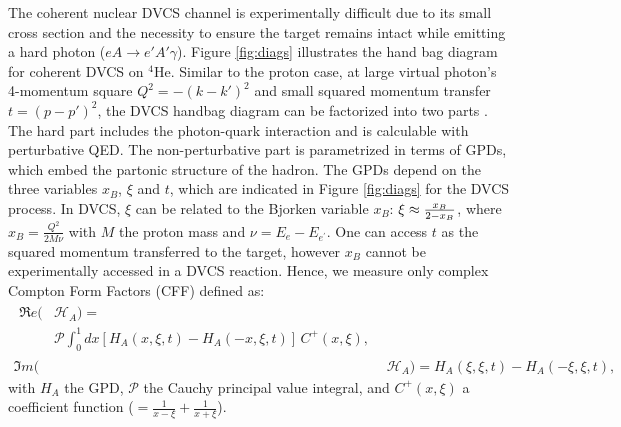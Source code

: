 \documentclass[preprint,nofootinbib,showpacs,prl,superscriptaddress,secnumarabic,amssymb,nobibnotes,aps,floatfix]{revtex4}
\begin{document}
The coherent nuclear DVCS channel is experimentally difficult due to  
its small cross section and the necessity to ensure the target remains 
intact while emitting a hard photon ($eA \rightarrow e' A' \gamma$). Figure 
\ref{fig:diags} illustrates the hand bag diagram for coherent DVCS on 
$^4$He. Similar to the proton case, at large virtual photon's 4-momentum square 
$Q^2=-(k-k')^{2}$ and small squared momentum transfer $t=(p-p')^{2}$,
the DVCS handbag diagram can be factorized into two parts 
\cite{Freund_Collins,Ji_Osborne}. The hard part includes the photon-quark 
interaction and is calculable with perturbative QED.  The non-perturbative 
part is parametrized in terms of GPDs, which embed the partonic structure of 
the hadron. The GPDs depend on the three variables $x_B$, $\xi$ and $t$, which are 
indicated in Figure \ref{fig:diags} for the DVCS process. In DVCS, $\xi$ can 
be related to the Bjorken variable $x_{B}$: $\xi\approx {{x_B}\over{2-x_B}}$, 
where $x_B=\frac{Q^2}{2M\nu}$ with $M$ the proton mass and 
$\nu=E_e-E_{e^\prime}$. One can access $t$ as the squared momentum 
transferred to the target, however $x_B$ cannot be experimentally 
accessed in a DVCS reaction. Hence, we measure only complex Compton Form 
Factors (CFF) \cite{Guidal:2013rya} defined as:
\begin{align}
\begin{split}
\Re e(&\mathcal{H}_{A}) = \\
    &\mathcal{P} 
\int_{0}^{1}dx[H_A(x,\xi,t)-H_A(-x,\xi,t)] \, C^{+}(x,\xi), 
\end{split} \\
\Im m(&\mathcal{H}_{A}) = H_A(\xi,\xi,t)-H_A(-\xi,\xi,t),
\end{align}
with $H_A$ the GPD, $\mathcal{P}$ 
the Cauchy principal value integral, and $C^{+}(x,\xi)$ a coefficient function 
($=  \frac{1}{x-\xi} + \frac{1}{x+\xi}$).
\end{document}
